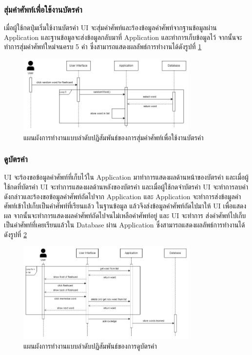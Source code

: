 \documentclass[12pt,oneside,openright,a4paper]{cpe-thai-project}
\begin{document}
\subsubsection{สุ่มคำศัพท์เพื่อใช้งานบัตรคำ}
\hspace{1cm}
เมื่อผู้ใช้กดปุ่มเริ่มใช้งานบัตรคำ UI จะสุ่มคำศัพท์และร้องข้อมูลคำศัพท์จากฐานข้อมูลผ่าน Application
และฐานข้อมูลจะส่งข้อมูลกลับมาที่ Application และทำการเก็บข้อมูลไว้ จากนั้นจะทำการสุ่มคำศัพท์ใหม่จนครบ 5 คำ
ซึ่งสามารถแสดงผลลัพธ์การทำงานได้ดังรูปที่ \ref{fig:S_RandomFlashcard}
\begin{figure}[!h]\centering
	\includegraphics[width=0.8\textwidth, keepaspectratio=true]{image/chap3/sequence/Flash-Random.jpg}
	\caption{แผนผังการทำงานแบบลำดับปฏิสัมพันธ์ของการสุ่มคำศัพท์เพื่อใช้งานบัตรคำ}\label{fig:S_RandomFlashcard}
\end{figure}

\pagebreak
\subsubsection{ดูบัตรคำ}
\hspace{1cm}
UI จะร้องขอข้อมูลคำศัพท์ที่เก็บไว้ใน Application มาทำการแสดงผลด้านหน้าของบัตรคำ และเมื่อผู้ใช้กดที่บัตรคำ UI จะทำการแสดงผลด้านหลังของบัตรคำ
และเมื่อผู้ใช้กดจำบัตรคำ UI จะทำการลบคำดังกล่าวและร้องขอข้อมูลคำศัพท์ถัดไปจาก Application และ Application จะทำการส่งข้อมูลคำศัพท์เข้าไปเก็บเป็นคำศัพท์ที่เรียนแล้ว
ในฐานข้อมูล แล้วจึงส่งข้อมูลคำศัพท์ถัดไปมาให้ UI เพื่อแสดงผล จากนั้นจะทำการแสดงผลคำศัพท์ถัดไปจนไม่เหลือคำศัพท์อยู่ และ UI จะทำการ
ส่งคำศัพท์ไปเก็บเป็นคำศัพท์ที่เคยเรียนแล้วใน Database ผ่าน Application ซึ่งสามารถแสดงผลลัพธ์การทำงานได้ดังรูปที่ \ref{fig:S_Flashcard}
\begin{figure}[!h]\centering
	\includegraphics[width=0.8\textwidth, keepaspectratio=true]{image/chap3/sequence/Flashcard.jpg}
	\caption{แผนผังการทำงานแบบลำดับปฏิสัมพันธ์ของการดูบัตรคำ}\label{fig:S_Flashcard}
\end{figure}
\end{document}
